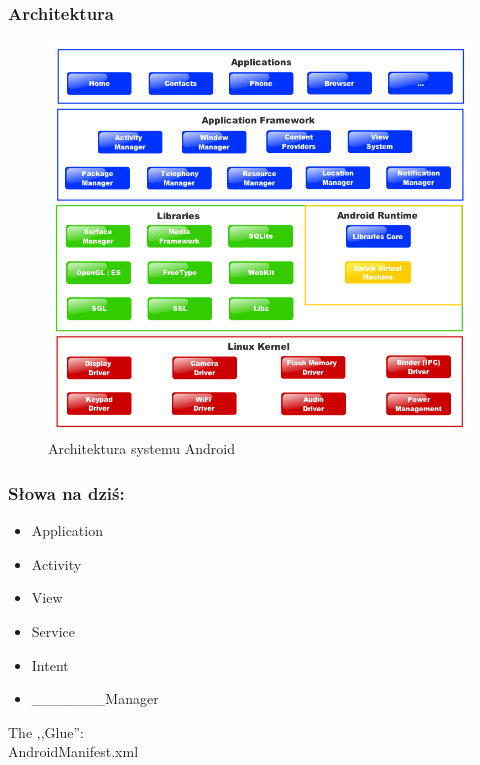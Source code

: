 \documentclass{beamer}
\begin{document}
\begin{frame}\frametitle{Architektura}

  \begin{figure}[t]
    \includegraphics[height=0.62\textheight,keepaspectratio=true,clip=true]{images/platform}
    \caption{Architektura systemu Android}
  \end{figure}

\end{frame}

\begin{frame}\frametitle{Słowa na dziś:}
 \begin{itemize}
  \item \Huge{Application}
  \item \Huge{Activity}
  \item \Huge{View}
  \item \Huge{Service}
  \item \Huge{Intent}
  \item \_\_\_\_\_\_\_\Huge{Manager}
 \end{itemize}
\end{frame}

\begin{frame}
\begin{center}
 \Huge{The ,,Glue'':}\\ 
 \Huge{AndroidManifest.xml}
\end{center}

\end{frame}
\end{document}
